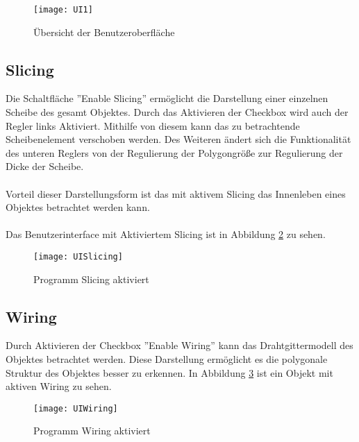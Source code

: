 \begin{figure}[H]
	\centering
	\texttt{[image: UI1]}
	\caption{Übersicht der Benutzeroberfläche}
	\label{fig:UI1}
\end{figure}
\subsection{Slicing}
Die Schaltfläche ''Enable Slicing'' ermöglicht die Darstellung einer einzelnen Scheibe des gesamt Objektes. Durch das Aktivieren der Checkbox wird auch der Regler links Aktiviert. Mithilfe von diesem kann das zu betrachtende Scheibenelement verschoben werden. Des Weiteren ändert sich die Funktionalität des unteren Reglers von der Regulierung der Polygongröße zur Regulierung der Dicke der Scheibe.\\
\\
Vorteil dieser Darstellungsform ist das mit aktivem Slicing das Innenleben eines Objektes betrachtet werden kann.\\
\\
Das Benutzerinterface mit Aktiviertem Slicing ist in Abbildung \ref{fig:UISlicing} zu sehen.
\begin{figure}[H]
	\centering
	\texttt{[image: UISlicing]}
	\caption{Programm Slicing aktiviert}
	\label{fig:UISlicing}
\end{figure}
\subsection{Wiring}
Durch Aktivieren der Checkbox ''Enable Wiring'' kann das Drahtgittermodell des Objektes betrachtet werden. Diese Darstellung ermöglicht es die polygonale Struktur des Objektes besser zu erkennen. In Abbildung \ref{fig:UIWiring} ist ein Objekt mit aktiven Wiring zu sehen.
\begin{figure}[H]
	\centering
	\texttt{[image: UIWiring]}
	\caption{Programm Wiring aktiviert}
	\label{fig:UIWiring}
\end{figure}